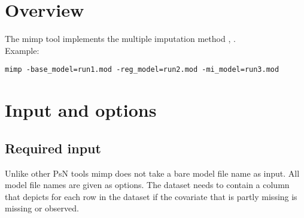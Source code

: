 



\maketitle
\newcommand{\guidetoolname}{mimp}


\section{Overview}
The mimp tool implements the multiple imputation method \cite{Johansson1}, \cite{Johansson2}.\\
Example:
\begin{verbatim}
mimp -base_model=run1.mod -reg_model=run2.mod -mi_model=run3.mod
\end{verbatim}

\section{Input and options}

\subsection{Required input}
Unlike other PsN tools mimp does not take a bare model file name as input. All model file names are given as options. The dataset needs to contain a column that depicts for each row in the dataset if the covariate that is partly missing is missing or observed.

